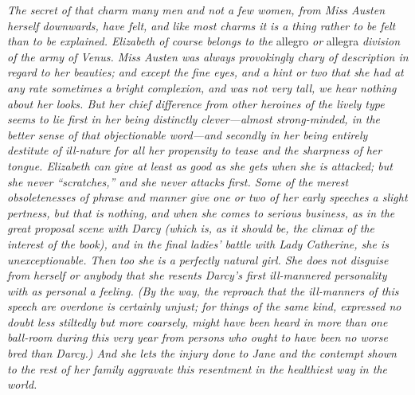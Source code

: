 \documentclass[12pt]{book}
\begin{document}
\textit{The secret of that charm many men and not a few women, from Miss Austen herself downwards, have felt, and like most charms it is a thing rather to be felt than to be explained. Elizabeth of course belongs to the} allegro \textit{or} allegra \textit{division of the army of Venus. Miss Austen was always provokingly chary of description in regard to her beauties; and except the fine eyes, and a hint or two that she had at any rate sometimes a bright complexion, and was not very tall, we hear nothing about her looks. But her chief difference from other heroines of the lively type seems to lie first in her being distinctly clever---almost strong-minded, in the better sense of that objectionable word---and secondly in her being entirely destitute of ill-nature for all her propensity to tease and the sharpness of her tongue. Elizabeth can give at least as good as she gets when she is attacked; but she never ``scratches,'' and she never attacks first. Some of the merest obsoletenesses of phrase and manner give one or two of her early speeches a slight pertness, but that is nothing, and when she comes to serious business, as in the great proposal scene with Darcy (which is, as it should be, the climax of the interest of the book), and in the final ladies' battle with Lady Catherine, she is unexceptionable. Then too she is a perfectly natural girl. She does not disguise from herself or anybody that she resents Darcy's first ill-mannered personality with as personal a feeling. (By the way, the reproach that the ill-manners of this speech are overdone is certainly unjust; for things of the same kind, expressed no doubt less stiltedly but more coarsely, might have been heard in more than one ball-room during this very year from persons who ought to have been no worse bred than Darcy.) And she lets the injury done to Jane and the contempt shown to the rest of her family aggravate this resentment in the healthiest way in the world.}
\end{document}
